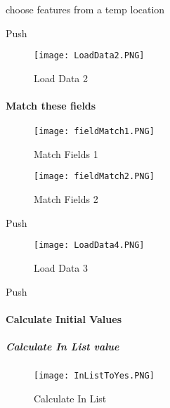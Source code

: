  {\bigbtn choose features from a temp location}
 
\vspace{.2in} 
 
 {\bigbtn Push } 
 
 
 \begin{figure}[h!]
 \centering
     \texttt{[image: LoadData2.PNG]}
 \caption{Load Data 2}
 \end{figure}
 
\clearpage

 \paragraph[Match these fields]{\Large Match these fields}

 \begin{figure}[h!]
 \centering
     \texttt{[image: fieldMatch1.PNG]}
 \vspace{-.2in}

 \caption{Match Fields 1}
 \end{figure}
 \begin{figure}[h!]
 \centering
     \texttt{[image: fieldMatch2.PNG]}
 \vspace{-.2in}

 \caption{Match Fields 2}
 \end{figure}
 \clearpage
{\bigbtn Push }
 \begin{figure}[h!]
 \centering
     \texttt{[image: LoadData4.PNG]}
 \caption{Load Data 3}
 \end{figure}

{\bigbtn Push }

 \clearpage
   
   
\paragraph{Calculate Initial Values}


\subparagraph{Calculate In List value}

\begin{figure}[h!]
 \centering
     \texttt{[image: InListToYes.PNG]}
 \caption{Calculate In List}
 \end{figure}


